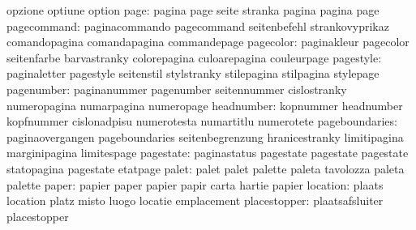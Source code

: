                            opzione                   optiune
                           option
                     page: pagina                    page
                           seite                     stranka
                           pagina                    pagina
                           page
              pagecommand: paginacommando            pagecommand
                           seitenbefehl              strankovyprikaz
                           comandopagina             comandapagina
                           commandepage
                pagecolor: paginakleur               pagecolor
                           seitenfarbe               barvastranky
                           colorepagina              culoarepagina
                           couleurpage
                pagestyle: paginaletter              pagestyle
                           seitenstil                stylstranky
                           stilepagina               stilpagina
                           stylepage
               pagenumber: paginanummer              pagenumber
                           seitennummer              cislostranky
                           numeropagina              numarpagina
                           numeropage
               headnumber: kopnummer                 headnumber
                           kopfnummer                cislonadpisu
                           numerotesta               numartitlu
                           numerotete
           pageboundaries: paginaovergangen          pageboundaries
                           seitenbegrenzung          hranicestranky
                           limitipagina              marginipagina
                           limitespage
                pagestate: paginastatus              pagestate
                           pagestate                 pagestate
                           statopagina               pagestate
                           etatpage
                    palet: palet                     palet
                           palette                   paleta
                           tavolozza                 paleta
                           palette
                    paper: papier                    paper
                           papier                    papir
                           carta                     hartie
                           papier
                 location: plaats                    location
                           platz                     misto
                           luogo                     locatie
                           emplacement
             placestopper: plaatsafsluiter           placestopper
